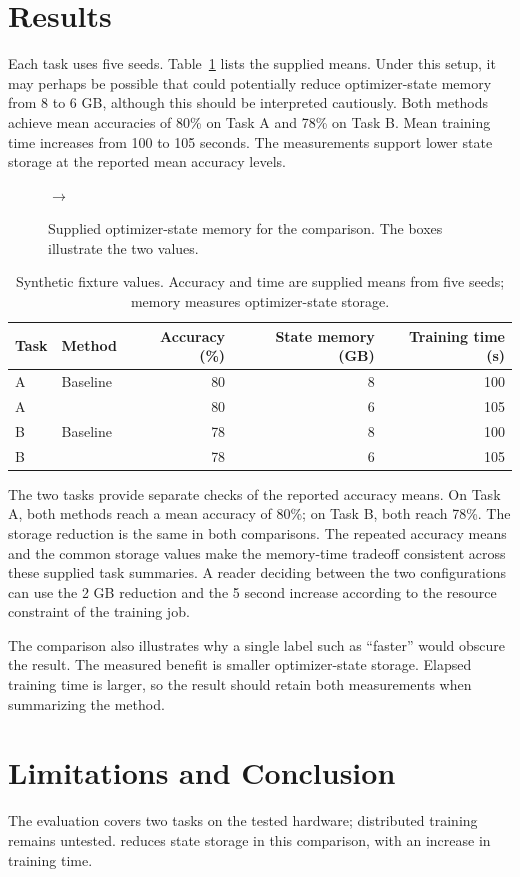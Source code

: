 \section{Results}\label{sec:results}
Each task uses five seeds. Table~\ref{tab:wide} lists the supplied means.
Under this setup, it may perhaps be possible that \method{} could potentially reduce optimizer-state memory from 8 to 6 GB, although this should be interpreted cautiously.
Both methods achieve mean accuracies of 80\% on Task A and 78\% on Task B.
Mean training time increases from 100 to 105 seconds.
The measurements support lower state storage at the reported mean accuracy levels.

\begin{figure}[h]
\centering
{}
$\longrightarrow$
\caption{Supplied optimizer-state memory for the comparison. The boxes illustrate the two values.}\label{fig:storage}
\end{figure}

\begin{table}[t]
\centering
\caption{Synthetic fixture values. Accuracy and time are supplied means from five seeds; memory measures optimizer-state storage.}\label{tab:wide}
\begin{tabular}{llrrr}
\toprule
Task & Method & Accuracy (\%) & State memory (GB) & Training time (s)\\
\midrule
A & Baseline & 80 & 8 & 100\\
A & \method{} & 80 & 6 & 105\\
B & Baseline & 78 & 8 & 100\\
B & \method{} & 78 & 6 & 105\\
\bottomrule
\end{tabular}
\end{table}


The two tasks provide separate checks of the reported accuracy means.
On Task A, both methods reach a mean accuracy of 80\%; on Task B, both reach 78\%.
The storage reduction is the same in both comparisons.
The repeated accuracy means and the common storage values make the memory-time tradeoff consistent across these supplied task summaries.
A reader deciding between the two configurations can use the 2 GB reduction and the 5 second increase according to the resource constraint of the training job.

The comparison also illustrates why a single label such as ``faster'' would obscure the result.
The measured benefit is smaller optimizer-state storage.
Elapsed training time is larger, so the result should retain both measurements when summarizing the method.

\section{Limitations and Conclusion}
The evaluation covers two tasks on the tested hardware; distributed training remains untested.
\method{} reduces state storage in this comparison, with an increase in training time.
\label{pw:main-end}
